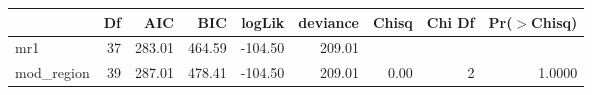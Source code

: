 \begin{table}[ht]
\centering
\begin{tabular}{lrrrrrrrr}
  \hline
 & Df & AIC & BIC & logLik & deviance & Chisq & Chi Df & Pr($>$Chisq) \\ 
  \hline
mr1 & 37 & 283.01 & 464.59 & -104.50 & 209.01 &  &  &  \\ 
  mod\_region & 39 & 287.01 & 478.41 & -104.50 & 209.01 & 0.00 & 2 & 1.0000 \\ 
   \hline
\end{tabular}
\end{table}
